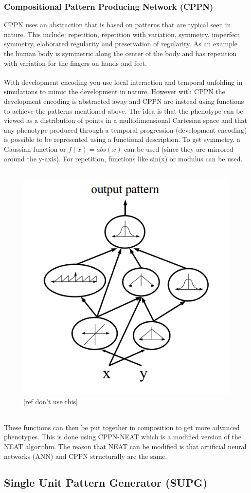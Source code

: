 \documentclass[11pt, a4paper]{article}
\begin{document}
\subsubsection{Compositional Pattern Producing Network (CPPN)}
CPPN uses an abstraction that is based on patterns that are typical seen in nature. This include: repetition, repetition with variation, symmetry, imperfect symmetry, elaborated regularity and preservation of regularity. As an example the human body is symmetric along the center of the body and has repetition with variation for the fingers on hands and feet.
\\ \\
With development encoding you use local interaction and temporal unfolding in simulations to mimic the development in nature. However with CPPN the development encoding is abstracted away and CPPN are instead using functions to achieve the patterns mentioned above. The idea is that the phenotype can be viewed as a distribution of points in a multidimensional Cartesian space and that any phenotype produced through a temporal progression (development encoding) is possible to be represented using a functional description. To get symmetry, a Gaussian function or $ f(x) = abs(x) $ can be used (since they are mirrored around the y-axis). For repetition, functions like sin(x) or modulus can be used. 
\\ \\
\begin{figure}[!ht]
\centering
\includegraphics[scale=0.4]{CompositionOfFunctions}
\caption{[ref don't use this]}
\end{figure}
\\
These functions can then be put together in composition to get more advanced phenotypes. This is done using CPPN-NEAT which is a modified version of the NEAT algorithm. The reason that NEAT can be modified is that artificial neural networks (ANN) and CPPN structurally are the same.
\subsection{Single Unit Pattern Generator (SUPG)}
\end{document}
